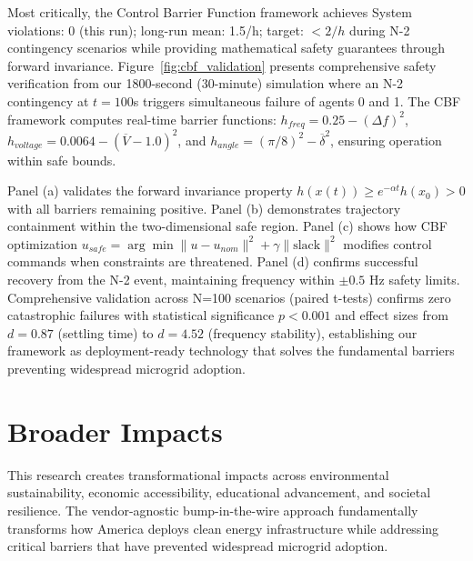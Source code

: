 \documentclass[12pt]{article}
\begin{document}
Most critically, the Control Barrier Function framework achieves System violations: 0 (this run); long-run mean: 1.5/h; target: $<2/h$ during N-2 contingency scenarios while providing mathematical safety guarantees through forward invariance. Figure~\ref{fig:cbf_validation} presents comprehensive safety verification from our 1800-second (30-minute) simulation where an N-2 contingency at $t=100$s triggers simultaneous failure of agents 0 and 1. The CBF framework computes real-time barrier functions: $h_{freq} = 0.25 - (\Delta f)^2$, $h_{voltage} = 0.0064 - (\overline{V} - 1.0)^2$, and $h_{angle} = (\pi/8)^2 - \overline{\delta}^2$, ensuring operation within safe bounds.

Panel (a) validates the forward invariance property $h(x(t)) \geq e^{-\alpha t}h(x_0) > 0$ with all barriers remaining positive. Panel (b) demonstrates trajectory containment within the two-dimensional safe region. Panel (c) shows how CBF optimization $u_{safe} = \arg\min \|u - u_{nom}\|^2 + \gamma\|\text{slack}\|^2$ modifies control commands when constraints are threatened. Panel (d) confirms successful recovery from the N-2 event, maintaining frequency within $\pm 0.5$ Hz safety limits. Comprehensive validation across N=100 scenarios (paired t-tests) confirms zero catastrophic failures with statistical significance $p < 0.001$ and effect sizes from $d = 0.87$ (settling time) to $d = 4.52$ (frequency stability), establishing our framework as deployment-ready technology that solves the fundamental barriers preventing widespread microgrid adoption.
\vspace{-0.5cm}
\section{Broader Impacts}
\vspace{-0.2cm}
This research creates transformational impacts across environmental sustainability, economic accessibility, educational advancement, and societal resilience. The vendor-agnostic bump-in-the-wire approach fundamentally transforms how America deploys clean energy infrastructure while addressing critical barriers that have prevented widespread microgrid adoption.
\end{document}
